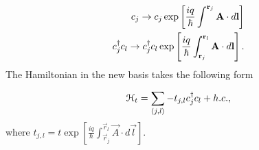 \begin{align}
  c_j \rightarrow c_j \exp \left[{\frac{iq}{\hbar} \int^{\mathbf{r}_j} \mathbf{A}\cdot d\mathbf{l}} \right] \nonumber \\
  c^{\dagger}_j c_l \rightarrow c^{\dagger}_j c_l \exp \left[{\frac{iq}{\hbar} \int^{\mathbf{r}_l}_{\mathbf{r}_j} \mathbf{A}\cdot d\mathbf{l}} \right].
\end{align}
The Hamiltonian in the new basis takes the following form

\begin{equation}
  \mathcal{H}_t = \sum_{\langle j, l \rangle} -t_{j,l} c^{\dagger}_j c_{l} + h.c.,
\end{equation}
where $t_{j,l} = t \exp \left[{\frac{iq}{\hbar} \int^{\vec{r}_l}_{\vec{r}_j} \vec{A}\cdot d\vec{l}} \right]$.

